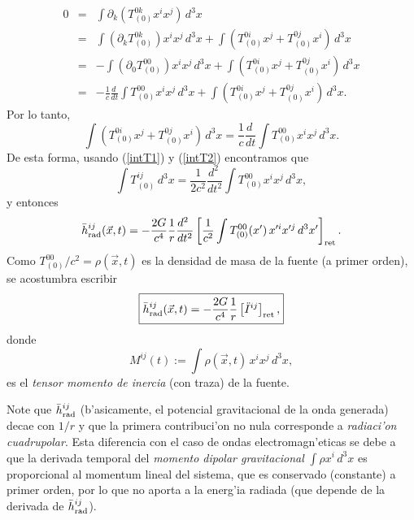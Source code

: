 \begin{eqnarray}
 0&=&\int\partial_k(T^{0k}_{(0)}x^ix^j)\,d^3x\\
&=&\int(\partial_kT^{0k}_{(0)})x^ix^j\,d^3x+\int \left(T^{0i}_{(0)}x^j+T^{0j}_{(0)}x^i\right)\,d^3x\\
&=&-\int(\partial_0T^{00}_{(0)})x^ix^j\,d^3x+\int \left(T^{0i}_{(0)}x^j+T^{0j}_{(0)}x^i\right)\,d^3x\\
&=&-\frac{1}{c}\frac{d\ }{dt}\int T^{00}_{(0)}x^ix^j\,d^3x+\int \left(T^{0i}_{(0)}x^j+T^{0j}_{(0)}x^i\right)\,d^3x.
\end{eqnarray}
Por lo tanto,
\begin{equation}\label{intT2}
 \int \left(T^{0i}_{(0)}x^j+T^{0j}_{(0)}x^i\right)\,d^3x=\frac{1}{c}\frac{d\ }{dt}\int T^{00}_{(0)}x^ix^j\,d^3x.
\end{equation}
De esta forma, usando (\ref{intT1}) y (\ref{intT2}) encontramos que
\begin{equation}
 \int T^{ij}_{(0)}\,d^3x=\frac{1}{2c^2}\frac{d^2\ }{dt^2}\int T^{00}_{(0)}x^ix^j\,d^3x,
\end{equation}
y entonces
\begin{equation}
\bar{h}_{\rm rad}^{ij}(\vec{x},t)=-\frac{2G}{c^4} \frac{1}{r}\frac{d^2\ }{dt^2}\left[\frac{1}{c^2}\int T^{00}_{(0)}(x')\,x'^ix'^j\,d^3x'\right]_{\rm ret}.
\end{equation}
Como $T^{00}_{(0)}/c^2=\rho(\vec{x},t)$ es la densidad de masa de la fuente (a primer orden), se acostumbra escribir
\begin{equation}\label{hrad}
\boxed{\bar{h}_{\rm rad}^{ij}(\vec{x},t)=-\frac{2G}{c^4} \frac{1}{r}\left[\ddot{I}^{ij}\right]_{\rm ret},}
\end{equation}
donde
\begin{equation}
M^{ij}(t):=\int \rho(\vec{x},t)\,x^ix^j\,d^3x,
\end{equation}
es el \textit{tensor momento de inercia} (con traza) de la fuente.

Note que $\bar{h}_{\rm rad}^{ij}$ (b'asicamente, el potencial gravitacional de la onda generada) decae con $1/r$ y que la primera contribuci'on no nula corresponde a \textit{radiaci'on cuadrupolar}. Esta diferencia con el caso de ondas electromagn'eticas se debe a que la derivada temporal del \textit{momento dipolar gravitacional} $\int \rho x^i\,d^3x$ es proporcional al momentum lineal del sistema, que es conservado (constante) a primer orden, por lo que no aporta a la energ'ia radiada (que depende de la derivada de $\bar{h}_{\rm rad}^{ij}$).


